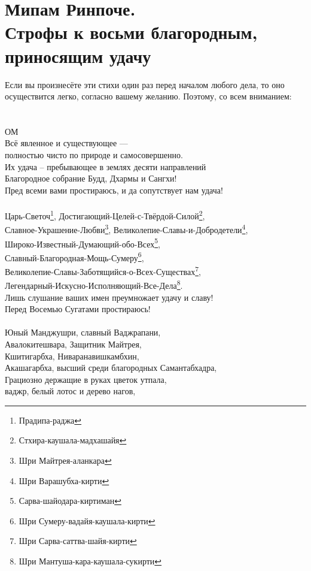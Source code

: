 \section{Мипам Ринпоче.\\Строфы к восьми благородным, \\приносящим удачу}
\scriptsize
Если вы произнесёте эти стихи один раз перед началом любого дела,
то оно осуществится легко, согласно вашему желанию. Поэтому, со всем вниманием:\\
\normalsize
\\
\\
ОМ\\
Всё явленное и существующее — \\ \indent полностью чисто по природе и самосовершенно.\\
Их удача – пребывающее в землях десяти направлений \\
Благородное собрание Будд, Дхармы и Сангхи!\\
Пред всеми вами простираюсь, и да сопутствует нам удача!\\
\\
Царь-Светоч\footnote{Прадипа-раджа}, Достигающий-Целей-с-Твёрдой-Силой\footnote{Стхира-каушала-мадхашайя},\\
Славное-Украшение-Любви\footnote{ Шри Майтрея-аланкара},  Великолепие-Славы-и-Добродетели\footnote{ Шри Варашубха-кирти},\\
Широко-Известный-Думающий-обо-Всех\footnote{ Сарва-шайодара-киртиман},\\
Славный-Благородная-Мощь-Сумеру\footnote{ Шри Сумеру-вадайя-каушала-кирти},\\
Великолепие-Славы-Заботящийся-о-Всех-Существах\footnote{ Шри Сарва-саттва-шайя-кирти},\\
Легендарный-Искусно-Исполняющий-Все-Дела\footnote{ Шри Мантуша-кара-каушала-сукирти}. \\
Лишь слушание ваших имен преумножает удачу и славу!\\
Перед Восемью Сугатами простираюсь!\\
\\
\newpage
Юный Манджушри, славный Ваджрапани,\\
Авалокитешвара, Защитник Майтрея,\\
Кшитигарбха, Ниваранавишкамбхин,\\
Акашагарбха, высший среди благородных Самантабхадра,\\
Грациозно держащие в руках цветок утпала, \\
\indent ваджр, белый лотос и дерево нагов,\\

